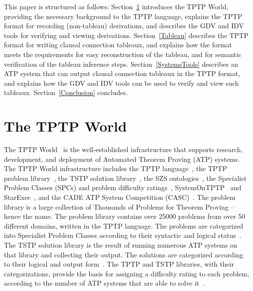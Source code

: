 \documentclass{ceurart}
\begin{document}
This paper is structured as follows:
Section~\ref{TPTP} introduces the TPTP World, providing the necessary background to the TPTP
language, explains the TPTP format for recording (non-tableau) derivations, and describes the
GDV and IDV tools for verifying and viewing derivations.
Section~\ref{Tableau} describes the TPTP format for writing clausal connection tableaux, and 
explains how the format meets the requirements for easy reconstruction of the tableau, and for 
semantic verification of the tableau inference steps.
Section~\ref{SystemsTools} describes an ATP system that can output clausal connection tableaux in 
the TPTP format, and explains how the GDV and IDV tools can be used to verify and view such 
tableaux.
Section~\ref{Conclusion} concludes.

\section{The TPTP World}
\label{TPTP}

The TPTP World~\cite{Sut24} is the well-established infrastructure that supports research, 
development, and deployment of Automated Theorem Proving (ATP) systems. %
The TPTP World infrastructure includes
the TPTP language~\cite{SS+06},
the TPTP problem library~\cite{Sut09},
the TSTP solution library~\cite{Sut10},
the SZS ontologies~\cite{Sut08-KEAPPA},
the Specialist Problem Classes (SPCs) and problem difficulty ratings~\cite{SS01},
SystemOnTPTP~\cite{Sut00-CADE-17} and StarExec~\cite{SST14},
and the CADE ATP System Competition (CASC)~\cite{Sut16}.
The problem library is a large collection of Thousands of Problems for Theorem Proving -- hence 
the name. 
The problem library contains over 25000 problems from over 50 different domains, written in the 
TPTP language.
The problems are categorized into Specialist Problem Classes according to their syntactic and
logical status~\cite{Sut08-KEAPPA}.
The TSTP solution library is the result of running numerous ATP systems on that library and 
collecting their output. 
The solutions are categorized according to their logical and output form~\cite{Sut08-KEAPPA}.
The TPTP and TSTP libraries, with their categorizations, provide the basis for assigning a 
difficulty rating to each problem, according to the number of ATP systems that are able to solve 
it~\cite{SS01}.
\end{document}
